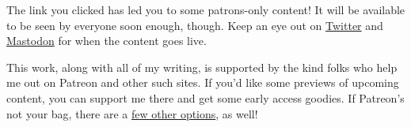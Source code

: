 The link you clicked has led you to some patrons-only content! It will be available to be seen by everyone soon enough, though. Keep an eye out on \href{https://twitter.com/makyo_writes}{Twitter} and \href{https://snouts.online/@makyo}{Mastodon} for when the content goes live.

This work, along with all of my writing, is supported by the kind folks who help me out on Patreon and other such sites. If you'd like some previews of upcoming content, you can support me there and get some early access goodies. If Patreon's not your bag, there are a \href{https://writing.drab-makyo.com/support/}{few other options}, as well!

